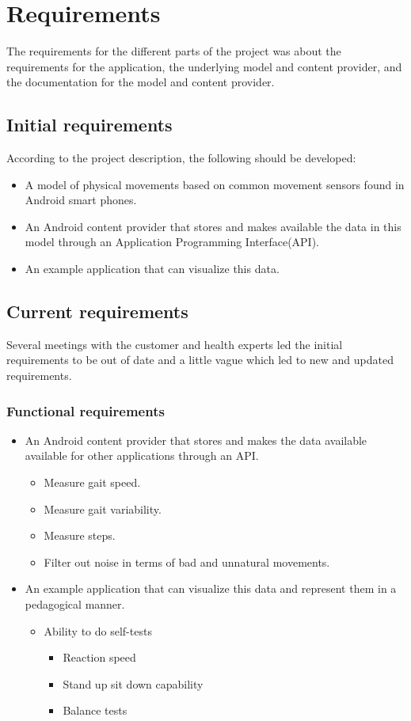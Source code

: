 \chapter{Requirements}
The requirements for the different parts of the project was about the requirements for the application, the underlying model and content provider, and the documentation for the model and content provider. 

\section{Initial requirements}

According to the project description, the following should be developed:
\begin{itemize}
\item A model of physical movements based on common movement sensors found in Android smart phones.
\item An Android content provider that stores and makes available the data in this model through an Application Programming Interface(API).
\item An example application that can visualize this data.
\end{itemize}

\section{Current requirements}
Several meetings with the customer and health experts led the initial requirements to be out of date and a little vague which led to new and updated requirements.

\subsection{Functional requirements}
\begin{itemize}
\item An Android content provider that stores and makes the data available available for other applications through an API.
\begin{itemize}
\item Measure gait speed.
\item Measure gait variability.
\item Measure steps.
\item Filter out noise in terms of bad and unnatural movements.
\end{itemize}
\item An example application that can visualize this data and represent them in a pedagogical manner.
\begin{itemize}
\item Ability to do self-tests
\begin{itemize}
\item Reaction speed
\item Stand up sit down capability
\item Balance tests
\end{itemize}
\end{itemize}
\end{itemize}	


